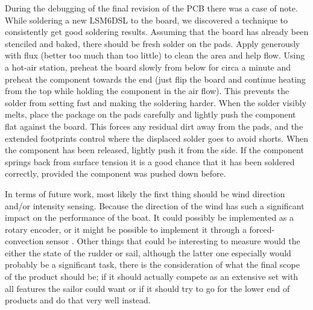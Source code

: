 During the debugging of the final revision of the PCB there was a case of note. While soldering a new LSM6DSL to the board, we discovered a technique to consistently get good soldering results. Assuming that the board has already been stenciled and baked, there should be fresh solder on the pads. Apply generously with flux (better too much than too little) to clean the area and help flow. Using a hot-air station, preheat the board slowly from below for circa a minute and preheat the component towards the end (just flip the board and continue heating from the top while holding the component in the air flow). This prevents the solder from setting fast and making the soldering harder. When the solder visibly melts, place the package on the pads carefully and lightly push the component flat against the board. This forces any residual dirt away from the pads, and the extended footprints control where the displaced solder goes to avoid shorts. When the component has been released, lightly push it from the side. If the component springs back from surface tension it is a good chance that it has been soldered correctly, provided the component was pushed down before. 

In terms of future work, most likely the first thing should be wind direction and/or intensity sensing. Because the direction of the wind has such a significant impact on the performance of the boat. It could possibly be implemented as a rotary encoder, or it might be possible to implement it through a forced-convection sensor%
. Other things that could be interesting to measure would the either the state of the rudder or sail, although the latter one especially would probably be a significant task, there is the consideration of what the final scope of the product should be; if it should actually compete as an extensive set with all features the sailor could want or if it should try to go for the lower end of products and do that very well instead. 

